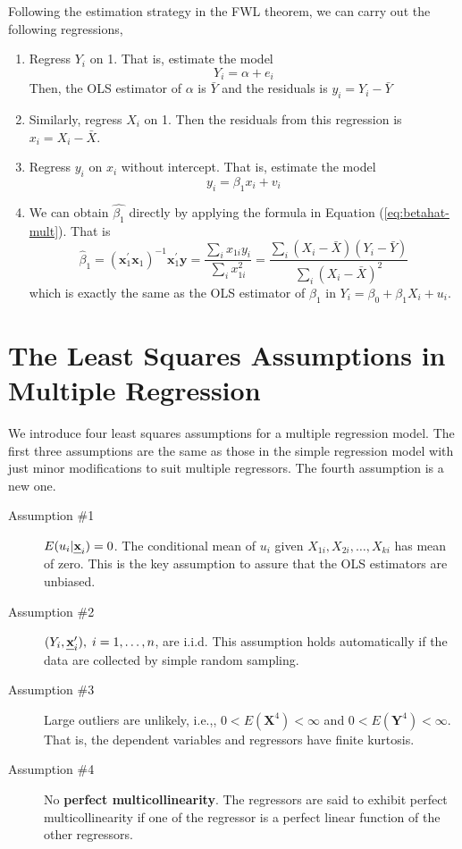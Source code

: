 \documentclass[a4paper,11pt]{article}
\def\mathbi#1{\textbf{\em #1}}
\begin{document}
Following the estimation strategy in the FWL theorem, we can carry out
the following regressions,
\begin{enumerate}
\item Regress \(Y_i\) on 1. That is, estimate the model
\[ Y_i = \alpha + e_i \]
Then, the OLS estimator of \(\alpha\) is
\(\bar{Y}\) and the residuals is \(y_i = Y_i - \bar{Y}\)
\item Similarly, regress \(X_{i}\) on 1. Then
the residuals from this regression is \(x_{i} = X_{i} -
   \bar{X}\).
\item Regress \(y_i\) on \(x_{i}\) without intercept. That is,
estimate the model
\[ y_i = \beta_1 x_{i} + v_i \]
\item We can obtain \(\hat{\beta_1}\) directly by applying the formula in
Equation (\ref{eq:betahat-mult}). That is 
\[ \hat{\beta}_1 = (\mathbf{x}_1^{\prime} \mathbf{x}_1)^{-1}
   \mathbf{x}_1^{\prime} \mathbf{y} = \frac{\sum_i x_{1i} y_i}{\sum_i
   x_{1i}^2} = \frac{\sum_i (X_i-\bar{X})(Y_i-\bar{Y})}{\sum_i(X_i-\bar{X})^2} \] 
which is exactly the same as the OLS estimator of \(\beta_1\) in \(Y_i
   = \beta_0 + \beta_1 X_i + u_i\).
\end{enumerate}


\section{The Least Squares Assumptions in Multiple Regression}
\label{sec:org4624bd6}

We introduce four least squares assumptions for a multiple regression
model. The first three assumptions are the same as those in the
simple regression model with just minor modifications to suit multiple
regressors. The fourth assumption is a new one. 

\begin{description}
\item[{Assumption \#1}] \(E(u_i | \mathbi{x}_i) = 0\). The conditional mean
of \(u_i\) given \(X_{1i}, X_{2i}, \ldots, X_{ki}\) has
mean of zero. This is the key assumption to assure
that the OLS estimators are unbiased.

\item[{Assumption \#2}] \((Y_i, \mathbi{x}_i^{\prime}),\; i=1, \ldots, n\), are
i.i.d. This assumption holds automatically if the
data are collected by simple random sampling.

\item[{Assumption \#3}] Large outliers are unlikely, i.e.,, \(0 <
                   E(\mathbf{X}^4) < \infty\) and \(0 < E(\mathbf{Y}^4)
                   < \infty\). That is, the dependent variables and
regressors have finite kurtosis.
\item[{Assumption \#4}] No \textbf{perfect multicollinearity}. The regressors are
said to exhibit perfect multicollinearity if one of
the regressor is a perfect linear function of the
other regressors.
\end{description}
\end{document}

